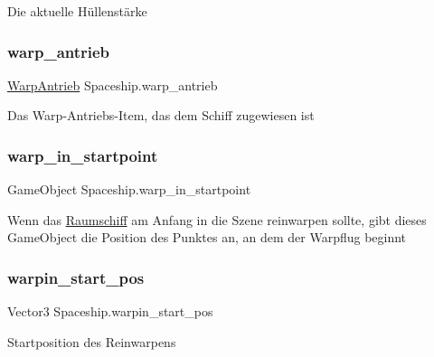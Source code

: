 Die aktuelle Hüllenstärke 

\mbox{\label{class_spaceship_a79ee5cdccdede956de6eae9a1619ccbc}} 
\subsubsection{\texorpdfstring{warp\+\_\+antrieb}{warp\_antrieb}}
{\footnotesize\ttfamily \hyperlink{class_warp_antrieb}{Warp\+Antrieb} Spaceship.\+warp\+\_\+antrieb}



Das Warp-\/\+Antriebs-\/\+Item, das dem Schiff zugewiesen ist 

\mbox{\label{class_spaceship_acef63fb7a63f7ee3cd351ecbbaaf4347}} 
\subsubsection{\texorpdfstring{warp\+\_\+in\+\_\+startpoint}{warp\_in\_startpoint}}
{\footnotesize\ttfamily Game\+Object Spaceship.\+warp\+\_\+in\+\_\+startpoint}



Wenn das \hyperlink{class_raumschiff}{Raumschiff} am Anfang in die Szene reinwarpen sollte, gibt dieses Game\+Object die Position des Punktes an, an dem der Warpflug beginnt 

\mbox{\label{class_spaceship_a1cb2c76d5ed1db05cba652b7a9cd71ca}} 
\subsubsection{\texorpdfstring{warpin\+\_\+start\+\_\+pos}{warpin\_start\_pos}}
{\footnotesize\ttfamily Vector3 Spaceship.\+warpin\+\_\+start\+\_\+pos}



Startposition des Reinwarpens 

\mbox{\label{class_spaceship_a17928c1e3b04001aaf33e9083731c647}} 
